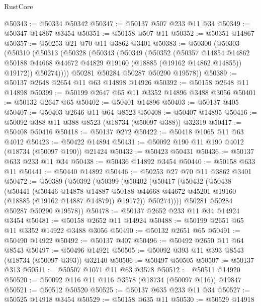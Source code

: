 \begin{lexlean}{RustCore}
\begin{coremodule}
@50343 := @50334 @50342
@50347 := @50137 @507 @233 @11 @34
@50349 := @50347 @14867 @3454
@50351 := @50158 @507 @11
@50352 := @50351 @14867
@50357 := @50253 @21 @70 @11 @3862 @3401
@50383 := @50300
    (@50303
      (@50310
        (@50313
          (@50328
            (@50343
              (@50349
                (@50352
                  (@50357
                    @14854
                    @14862
                    @50188
                    @44668
                    @44672
                    @44829
                    @19160
                    (@18885 (@19162 @14862 @14855))
                    @19172))
                @50274))))
        @50281
        @50284
        @50287
        @50290
        @19578))
@50389 := @50137 @2648 @2654 @11 @63 @14898 @14926
@50392 := @50158 @2648 @11 @14898
@50399 := @50199 @2647 @65 @11 @3352 @14896 @3488 @3056
@50401 := @50132 @2647 @65
@50402 := @50401 @14896
@50403 := @50137 @405
@50407 := @50403 @2646 @11 @64 @8523
@50408 := @50407 @14895
@50416 := @50092 @388 @11 @388 @8523 (@18734 (@50097 @388)) @32319
@50417 := @50408 @50416
@50418 := @50137 @272
@50422 := @50418 @1065 @11 @63 @4012
@50423 := @50422 @14894
@50431 := @50092 @190 @11 @190 @4012 (@18734 (@50097 @190)) @21424
@50432 := @50423 @50431
@50436 := @50137 @633 @233 @11 @34
@50438 := @50436 @14892 @3454
@50440 := @50158 @633 @11
@50441 := @50440 @14892
@50446 := @50253 @27 @70 @11 @3862 @3401
@50472 := @50389
    (@50392
      (@50399
        (@50402
          (@50417
            (@50432
              (@50438
                (@50441
                  (@50446
                    @14878
                    @14887
                    @50188
                    @44668
                    @44672
                    @45201
                    @19160
                    (@18885 (@19162 @14887 @14879))
                    @19172))
                @50274))))
        @50281
        @50284
        @50287
        @50290
        @19578))
@50478 := @50137 @2652 @233 @11 @34 @14924 @3454
@50481 := @50158 @2652 @11 @14924
@50488 := @50199 @2651 @65 @11 @3352 @14922 @3488 @3056
@50490 := @50132 @2651 @65
@50491 := @50490 @14922
@50492 := @50137 @407
@50496 := @50492 @2650 @11 @64 @8543
@50497 := @50496 @14921
@50505 := @50092 @393 @11 @393 @8543 (@18734 (@50097 @393)) @32140
@50506 := @50497 @50505
@50507 := @50137 @313
@50511 := @50507 @1071 @11 @63 @3578
@50512 := @50511 @14920
@50520 := @50092 @116 @11 @116 @3578 (@18734 (@50097 @116)) @19847
@50521 := @50512 @50520
@50525 := @50137 @635 @233 @11 @34
@50527 := @50525 @14918 @3454
@50529 := @50158 @635 @11
@50530 := @50529 @14918

\end{coremodule}
\end{lexlean}
